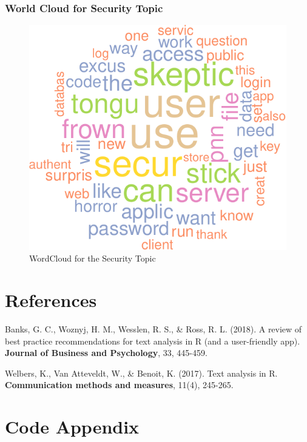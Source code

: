\documentclass[
]{article}
\begin{document}
\newpage

\hypertarget{world-cloud-for-security-topic}{%
\subsubsection{World Cloud for Security
Topic}\label{world-cloud-for-security-topic}}

\begin{figure}
\centering
\includegraphics{assign6_files/figure-latex/unnamed-chunk-19-1.pdf}
\caption{WordCloud for the Security Topic}
\end{figure}

\newpage

\hypertarget{references}{%
\section{\texorpdfstring{\textbf{References}}{References}}\label{references}}

Banks, G. C., Woznyj, H. M., Wesslen, R. S., \& Ross, R. L. (2018). A
review of best practice recommendations for text analysis in R (and a
user-friendly app). \textbf{Journal of Business and Psychology}, 33,
445-459.

Welbers, K., Van Atteveldt, W., \& Benoit, K. (2017). Text analysis in
R. \textbf{Communication methods and measures}, 11(4), 245-265.

\hypertarget{code-appendix}{%
\section{\texorpdfstring{\textbf{Code
Appendix}}{Code Appendix}}\label{code-appendix}}
\end{document}
